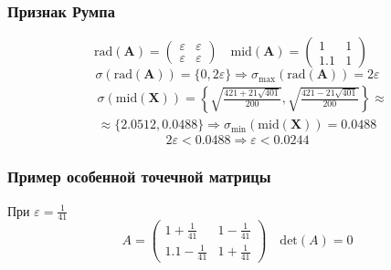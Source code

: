 \subsubsection{Признак Румпа}
\begin{equation}
    \mathrm{rad}(\mathbf{A})=\begin{pmatrix}
    \varepsilon&\varepsilon\\
    \varepsilon&\varepsilon
    \end{pmatrix}\quad
    \mathrm{mid}(\mathbf{A})=\begin{pmatrix}
    1&1\\
    1.1&1
    \end{pmatrix}\quad
\end{equation}
\begin{equation}
    \sigma(\mathrm{rad}(\mathbf{A}))=\{0,2\varepsilon\}\Rightarrow\sigma_{\mathrm{max}}(\mathrm{rad}(\mathbf{A}))=2\varepsilon
\end{equation}
\begin{equation}
\begin{split}
    &\sigma(\mathrm{mid}(\mathbf{X}))=\left\{\sqrt{\frac{421+21\sqrt{401}}{200}},\sqrt{\frac{421-21\sqrt{401}}{200}}\right\}\approx\\
    &\approx\{2.0512, 0.0488\}\Rightarrow\sigma_{\mathrm{min}}(\mathrm{mid}(\mathbf{X}))=0.0488
\end{split}
\end{equation}
\begin{equation}
    2\varepsilon<0.0488\Rightarrow\varepsilon<0.0244
\end{equation}
\subsubsection{Пример особенной точечной матрицы}
При $\varepsilon=\frac{1}{41}$
\begin{equation}
A=
\begin{pmatrix}
1+\frac{1}{41} & 1-\frac{1}{41} \\
1.1 - \frac{1}{41}& 1+\frac{1}{41} 
\end{pmatrix}
\quad
\mathrm{det}(A)=0
\end{equation}

